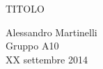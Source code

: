 \begin{center}

     	{\huge TITOLO}

     	\vspace{0.2cm}
	\vspace{0.3cm}

      	{\large Alessandro Martinelli}\\
		{ Gruppo A10} \\
	
	\vspace{0.1cm}
      	{ XX settembre 2014 }

\end{center}
